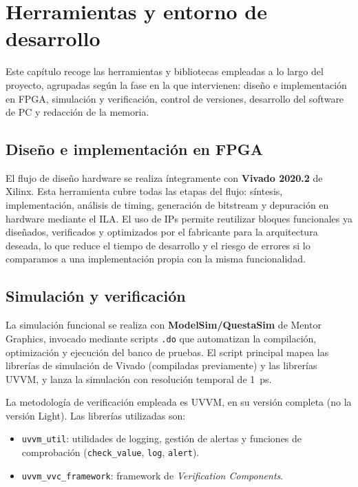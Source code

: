\documentclass[../main.tex]{subfiles}
\begin{document}
\chapter{Herramientas y entorno de desarrollo}
\label{chap:herramientas}
 
Este capítulo recoge las herramientas y bibliotecas empleadas a lo largo del proyecto, agrupadas según la fase en la que intervienen: diseño e implementación en FPGA, simulación y verificación, control de versiones, desarrollo del software de PC y redacción de la memoria.

 
\section{Diseño e implementación en FPGA}
 
El flujo de diseño hardware se realiza íntegramente con \textbf{Vivado 2020.2} de Xilinx. Esta herramienta cubre todas las etapas del flujo: síntesis, implementación, análisis de timing, generación de bitstream y depuración en hardware mediante el \ac{ILA}. El uso de \ac{IP}s permite reutilizar bloques funcionales ya diseñados, verificados y optimizados por el fabricante para la arquitectura deseada, lo que reduce el tiempo de desarrollo y el riesgo de errores si lo comparamos a una implementación propia con la misma funcionalidad.
 
\section{Simulación y verificación}
 
La simulación funcional se realiza con \textbf{ModelSim/QuestaSim} de Mentor Graphics, invocado mediante scripts \texttt{.do} que automatizan la compilación, optimización y ejecución del banco de pruebas. El script principal mapea las librerías de simulación de Vivado (compiladas previamente) y las librerías \ac{UVVM}, y lanza la simulación con resolución temporal de 1~ps.
 
La metodología de verificación empleada es \ac{UVVM}, en su versión completa (no la versión Light). Las librerías utilizadas son:
 
\begin{itemize}
    \item \texttt{uvvm\_util}: utilidades de logging, gestión de alertas y funciones de comprobación (\texttt{check\_value}, \texttt{log}, \texttt{alert}).
    \item \texttt{uvvm\_vvc\_framework}: framework de \textit{Verification Components}.
\end{itemize}
 
\end{document}
